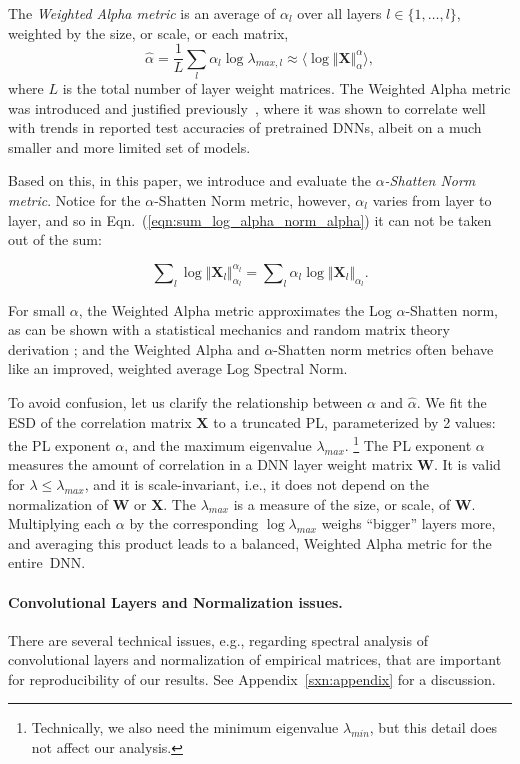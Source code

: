 The \emph{Weighted Alpha metric} is an average of $\alpha_l$ over all layers $l \in \{1,\ldots,l\}$, weighted by the size, or scale, or each matrix,
\begin{equation}
\hat{\alpha} = \dfrac{1}{L}\sum_l \alpha_l\log\lambda_{max,l}\approx\langle\log\Vert\mathbf{X}\Vert_{\alpha}^{\alpha}\rangle    ,
\end{equation}
where $L$ is the total number of layer weight matrices.
The Weighted Alpha metric was introduced and justified previously~\cite{MM20_SDM}, where it was shown to correlate well with trends in reported test accuracies of pretrained DNNs, albeit on a much smaller and more limited set of models.

Based on this, in this paper, we introduce and evaluate the \emph{$\alpha$-Shatten Norm metric}.
Notice for the $\alpha$-Shatten Norm metric, however, $\alpha_l$ varies from layer to layer, and so in Eqn.~(\ref{eqn:sum_log_alpha_norm_alpha}) it can not be taken out of the sum:

\begin{equation}
\label{eqn:sum_log_alpha_norm_alpha}
\sum\nolimits_l \log \Vert\mathbf{X}_l\Vert_{\alpha_l}^{\alpha_l} 
=
\sum\nolimits_l \alpha_l \log \Vert\mathbf{X}_l\Vert_{\alpha_l} .
\end{equation}

\noindent
For small $\alpha$, the Weighted Alpha metric approximates the Log $\alpha$-Shatten norm, as can be shown with a statistical mechanics and random matrix theory derivation \cite{MM20_unpub_work}; and the Weighted Alpha and $\alpha$-Shatten norm metrics often behave like an improved, weighted average Log Spectral Norm.

To avoid confusion, let us clarify the relationship between $\alpha$ and $\hat{\alpha}$.  
We fit the ESD of the correlation matrix $\mathbf{X}$ to a truncated PL, parameterized by 2 values: the PL exponent $\alpha$, and the maximum eigenvalue $\lambda_{max}$.%
\footnote{Technically, we also need the minimum eigenvalue $\lambda_{min}$, but this detail does not affect our analysis.}
The PL exponent $\alpha$ measures the amount of correlation in a DNN layer weight matrix $\mathbf{W}$. 
It is valid for $\lambda\le\lambda_{max}$, and it is scale-invariant, i.e., it does not depend on the normalization of $\mathbf{W}$ or $\mathbf{X}$.
The $\lambda_{max}$ is a measure of the size, or scale, of $\mathbf{W}$.
%
Multiplying each $\alpha$ by the corresponding $\log\lambda_{max}$ weighs ``bigger'' layers more, and averaging this product leads to a balanced, Weighted Alpha metric for the entire~DNN.


\paragraph{Convolutional Layers and Normalization issues.}
There are several technical issues, e.g., regarding spectral analysis of convolutional layers and normalization of empirical matrices, that are important for reproducibility of our results.
See Appendix~\ref{sxn:appendix} for a discussion.


